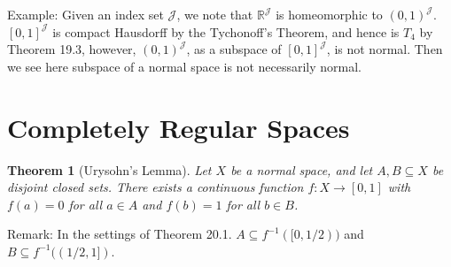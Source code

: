 \documentclass[11pt]{book}
\theoremstyle{break}
\theoremstyle{break}
\newtheorem{thm}{Theorem}[section]
\newcommand{\R}{\mathbb{R}}
\newcommand{\remark}{\color{blue}Remark: \color{black}}
\newcommand{\example}{\color{green}Example: \color{black}}
\begin{document}
\example Given an index set $\mathcal{J}$, we note that $\R^{\mathcal{J}}$ is homeomorphic to $(0,1)^{\mathcal{J}}$. $[0,1]^\mathcal{J}$ is compact Hausdorff by the Tychonoff's Theorem, and hence is $T_4$ by Theorem 19.3, however, $(0,1)^{\mathcal{J}}$, as a subspace of $[0,1]^\mathcal{J}$, is not normal. Then we see here subspace of a normal space is not necessarily normal.

\newpage
\section[Completely Regular Spaces]{\color{red}Completely Regular Spaces\color{black}}
\begin{thm}[Urysohn's Lemma]
Let $X$ be a normal space, and let $A,B\subseteq X$ be disjoint closed sets. There exists a continuous function $f:X \to [0,1]$ with $f(a) = 0$ for all $a\in A$ and $f(b)=1$ for all $b \in B$. 
\end{thm}
\remark In the settings of Theorem 20.1. $A\subseteq f^{-1}([0,1/2))$ and $B \subseteq f^{-1}((1/2, 1])$. 
\end{document}
